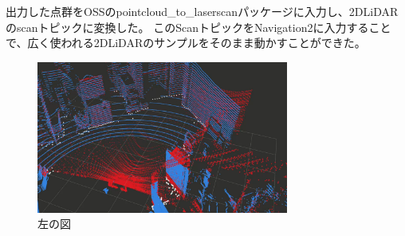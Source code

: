 出力した点群をOSSのpointcloud\_to\_laserscan\cite{laserscan}パッケージに入力し、2DLiDARのscanトピックに変換した。
このScanトピックをNavigation2に入力することで、広く使われる2DLiDARのサンプルをそのまま動かすことができた。

\begin{figure}[t]
    \centering
    \includegraphics[height=5cm]{fig/obstaclescan.png}
    \caption{左の図}
    \label{fig:obstaclescan}
\end{figure}